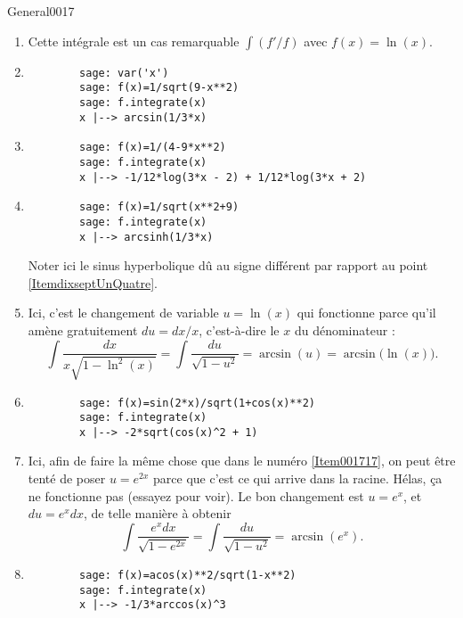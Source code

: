 \begin{corrige}{General0017}
\begin{enumerate}
\item
Cette intégrale est un cas remarquable $\int (f'/f)$ avec $f(x)=\ln(x)$.

\item\label{ItemdixseptUnQuatre}
	
	\begin{verbatim}
		sage: var('x')
		sage: f(x)=1/sqrt(9-x**2)
		sage: f.integrate(x)
		x |--> arcsin(1/3*x)
	\end{verbatim}


\item
	\begin{verbatim}
		sage: f(x)=1/(4-9*x**2)
		sage: f.integrate(x)   
		x |--> -1/12*log(3*x - 2) + 1/12*log(3*x + 2)
	\end{verbatim}
\item

	\begin{verbatim}
		sage: f(x)=1/sqrt(x**2+9)
		sage: f.integrate(x)     
		x |--> arcsinh(1/3*x)
	\end{verbatim}
	Noter ici le sinus hyperbolique dû au signe différent par rapport au point \ref{ItemdixseptUnQuatre}.
\item\label{Item001717}
Ici, c'est le changement de variable $u=\ln(x)$ qui fonctionne parce qu'il amène gratuitement $du=dx/x$, c'est-à-dire le $x$ du dénominateur :
\begin{equation}
	\int\frac{ dx }{ x\sqrt{1-\ln^2(x)} }=\int\frac{ du }{ \sqrt{1-u^2} }=\arcsin(u)=\arcsin\big( \ln(x) \big).
\end{equation}

\item

	\begin{verbatim}
		sage: f(x)=sin(2*x)/sqrt(1+cos(x)**2)
		sage: f.integrate(x)                 
		x |--> -2*sqrt(cos(x)^2 + 1)
	\end{verbatim}
	

\item
Ici, afin de faire la même chose que dans le numéro \ref{Item001717}, on peut être tenté de poser $u= e^{2x}$ parce que c'est ce qui arrive dans la racine. Hélas, ça ne fonctionne pas (essayez pour voir). Le bon changement est $u=e^x$, et $du= e^{x}dx$, de telle manière à obtenir
\begin{equation}
	\int\frac{  e^{x}dx }{ \sqrt{1- e^{2x}} }=\int\frac{ du }{ \sqrt{1-u^2} }=\arcsin(e^x).
\end{equation}

\item
	\begin{verbatim}
		sage: f(x)=acos(x)**2/sqrt(1-x**2)
		sage: f.integrate(x)              
		x |--> -1/3*arccos(x)^3
	\end{verbatim}


\end{enumerate}
\end{corrige}
